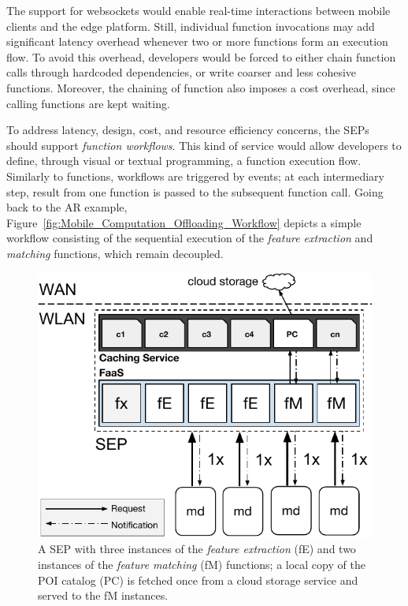 \documentclass[letterpaper, 10 pt, conference]{ieeeconf}  %
\begin{document}
The support for websockets would enable real-time interactions between mobile clients and the edge platform. Still, individual function invocations may add significant latency overhead whenever two or more functions form an execution flow. To avoid this overhead, developers would be forced to either chain function calls through hardcoded dependencies, or write coarser and less cohesive functions. Moreover, the chaining of function also imposes a cost overhead, since calling functions are kept waiting.%

To address latency, design, cost, and resource efficiency concerns, the SEPs should support \textit{function workflows}. This kind of service would allow developers to define, through visual or textual programming, a function execution flow.
Similarly to functions, workflows are triggered by events; at each intermediary step, result from one function is passed to the subsequent function call. Going back to the AR example, Figure~\ref{fig:Mobile_Computation_Offloading_Workflow} depicts a simple workflow consisting of the sequential execution of the \textit{feature extraction} and \textit{matching} functions, which remain decoupled.%

\begin{figure}[tbp]
	\centering
	\includegraphics[width=\linewidth]{Figs/Mobile_Computation_Offloading_Caching.pdf}
	\caption{A SEP with three instances of the \textit{feature extraction} (fE) and two instances of the \textit{feature matching} (fM) functions; a local copy of the POI catalog (PC) is fetched once from a cloud storage service and served to the fM instances.} 
	\label{fig:Mobile_Computation_Offloading_Caching}
\end{figure}
\end{document}
